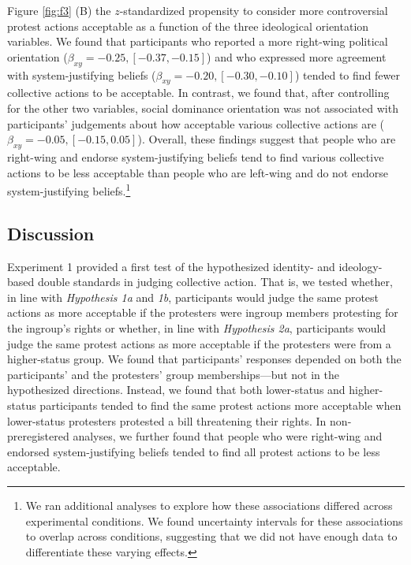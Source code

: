 \documentclass[twocolumn, 11pt, letterpaper]{article}
\begin{document}
Figure \ref{fig:f3} (B) the \(z\)-standardized propensity to consider
more controversial protest actions acceptable as a function of the three
ideological orientation variables. We found that participants who
reported a more right-wing political orientation
(\(\beta_{xy} = -0.25, [-0.37, -0.15]\)) and who expressed more
agreement with system-justifying beliefs
(\(\beta_{xy} = -0.20, [-0.30, -0.10]\)) tended to find fewer collective
actions to be acceptable. In contrast, we found that, after controlling
for the other two variables, social dominance orientation was not
associated with participants' judgements about how acceptable various
collective actions are (\(\beta_{xy} = -0.05, [-0.15, 0.05]\)). Overall,
these findings suggest that people who are right-wing and endorse
system-justifying beliefs tend to find various collective actions to be
less acceptable than people who are left-wing and do not endorse
system-justifying beliefs.\footnote{We ran additional analyses to
  explore how these associations differed across experimental
  conditions. We found uncertainty intervals for these associations to
  overlap across conditions, suggesting that we did not have enough data
  to differentiate these varying effects.}

\hypertarget{discussion}{%
\subsection{Discussion}\label{discussion}}

Experiment 1 provided a first test of the hypothesized identity- and
ideology-based double standards in judging collective action. That is,
we tested whether, in line with \emph{Hypothesis 1a} and \emph{1b},
participants would judge the same protest actions as more acceptable if
the protesters were ingroup members protesting for the ingroup's rights
or whether, in line with \emph{Hypothesis 2a}, participants would judge
the same protest actions as more acceptable if the protesters were from
a higher-status group. We found that participants' responses depended on
both the participants' and the protesters' group memberships---but not
in the hypothesized directions. Instead, we found that both lower-status
and higher-status participants tended to find the same protest actions
more acceptable when lower-status protesters protested a bill
threatening their rights. In non-preregistered analyses, we further
found that people who were right-wing and endorsed system-justifying
beliefs tended to find all protest actions to be less acceptable.
\end{document}
